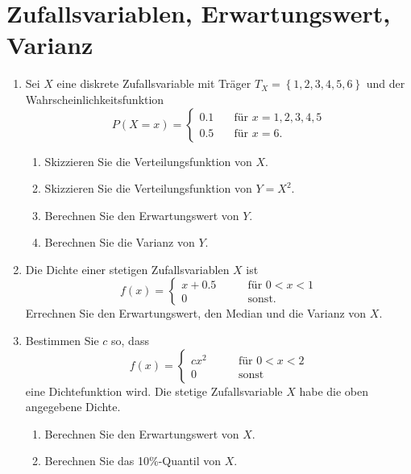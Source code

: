 \section[Zufallsvariablen]{Zufallsvariablen, Erwartungswert, Varianz}

\begin{enumerate}
\item Sei $X$ eine diskrete Zufallsvariable mit Tr\"{a}ger $T_{X}=\left\{
1,2,3,4,5,6\right\} $ und der Wahrscheinlichkeitsfunktion 
\begin{equation*}
P\left( X=x\right) =\left\{ 
\begin{array}{ll}
0.1 & \quad \text{f\"{u}r }x=1,2,3,4,5 \\ 
0.5 & \quad \text{f\"{u}r }x=6.%
\end{array}
\right.
\end{equation*}
\begin{enumerate}
\item Skizzieren Sie die Verteilungsfunktion von $X$.
\item Skizzieren Sie die Verteilungsfunktion von $Y=X^{2}$.
\item Berechnen Sie den Erwartungswert von $Y$.
\item Berechnen Sie die Varianz von $Y$.
\end{enumerate}

\item Die Dichte einer stetigen Zufallsvariablen $X$ ist 
\begin{equation*}
f(x)=\left\{ 
\begin{array}{ll}
x+0.5 & \qquad \text{f\"{u}r }0<x<1 \\ 
0 & \qquad \text{sonst.}%
\end{array}%
\right.
\end{equation*}%
Errechnen Sie den Erwartungswert, den Median und die Varianz von $X$.
\item Bestimmen Sie $c$ so, dass 
\begin{equation*}
f(x)=\left\{ 
\begin{array}{ll}
cx^{2} & \qquad \text{f\"{u}r }0<x<2 \\ 
0 & \qquad \text{sonst}%
\end{array}%
\right.
\end{equation*}
eine Dichtefunktion wird. Die stetige Zufallsvariable $X$ habe die oben
angegebene Dichte.
\begin{enumerate}
\item Berechnen Sie den Erwartungswert von $X$.
\item Berechnen Sie das 10\%-Quantil von $X$.
\end{enumerate}


\end{enumerate}
